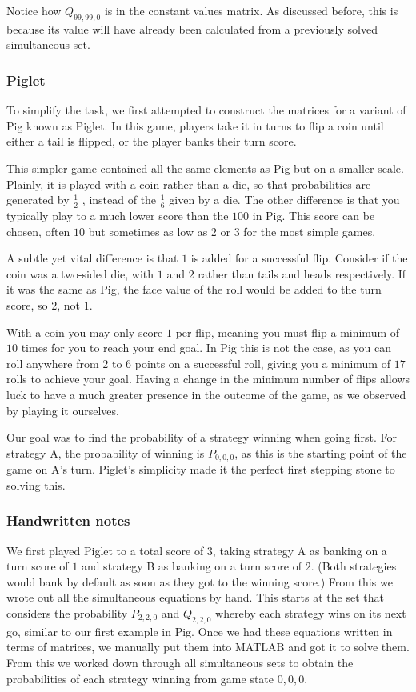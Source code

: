 \documentclass[a4paper,titlepage]{article}
\begin{document}
Notice how $Q_{99,99,0}$ is in the constant values matrix. As discussed before, this is because its value will have already been calculated from a previously solved simultaneous set.

\subsubsection{Piglet}
To simplify the task, we first attempted to construct the matrices for a variant of Pig known as Piglet. In this game, players take it in turns to flip a coin until either a tail is flipped, or the player banks their turn score.

This simpler game contained all the same elements as Pig but on a smaller scale. Plainly, it is played with a coin rather than a die, so that probabilities are generated by $\frac{1}{2}$ , instead of the $\frac{1}{6}$ given by a die. The other difference is that you typically play to a much lower score than the $100$ in Pig. This score can be chosen, often $10$ but sometimes as low as $2$ or $3$ for the most simple games.

A subtle yet vital difference is that $1$ is added for a successful flip. Consider if the coin was a two-sided die, with $1$ and $2$ rather than tails and heads respectively. If it was the same as Pig, the face value of the roll would be added to the turn score, so $2$, not $1$.

With a coin you may only score $1$ per flip, meaning you must flip a minimum of $10$ times for you to reach your end goal. In Pig this is not the case, as you can roll anywhere from $2$ to $6$ points on a successful roll, giving you a minimum of $17$ rolls to achieve your goal. Having a change in the minimum number of flips allows luck to have a much greater presence in the outcome of the game, as we observed by playing it ourselves.

Our goal was to find the probability of a strategy winning when going first. For strategy A, the probability of winning is $P_{0,0,0}$, as this is the starting point of the game on A's turn. Piglet's simplicity made it the perfect first stepping stone to solving this.

\subsubsection{Handwritten notes}
We first played Piglet to a total score of $3$, taking strategy A as banking on a turn score of $1$ and strategy B as banking on a turn score of $2$. (Both strategies would bank by default as soon as they got to the winning score.) From this we wrote out all the simultaneous equations by hand. This starts at the set that considers the probability $P_{2,2,0}$ and $Q_{2,2,0}$ whereby each strategy wins on its next go, similar to our first example in Pig. Once we had these equations written in terms of matrices, we manually put them into MATLAB and got it to solve them. From this we worked down through all simultaneous sets to obtain the probabilities of each strategy winning from game state $0,0,0$.
\end{document}
